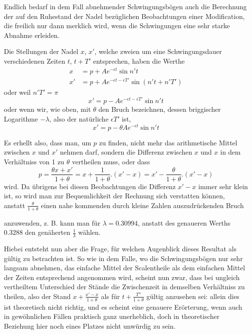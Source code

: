 Endlich bedarf in dem Fall abnehmender Schwingungsbögen auch die Berechnung der auf den Ruhestand der Nadel bezüglichen Beobachtungen einer Modification, die freilich nur dann merklich wird, wenn die Schwingungen eine sehr starke Abnahme erleiden.

Die Stellungen der Nadel $x$, $x'$, welche zweien um eine Schwingungsdauer verschiedenen Zeiten $t$, $t+T'$ entsprechen, haben die Werthe
\[
\begin{aligned}
x&=p+Ae^{-\epsilon t}\sin n't\\
x'&=p+Ae^{-\epsilon t-\epsilon T'}\sin(n't+n'T')
\end{aligned}
\]
oder weil $n'T'=\pi$
\[
x'=p-Ae^{-\epsilon t-\epsilon T'}\sin n't
\]
oder wenn wir, wie oben, mit $\theta$ den Bruch bezeichnen, dessen briggischer Logarithme $-\lambda$, also der natürliche $\epsilon T'$ ist,
\[
x'=p-\theta Ae^{-\epsilon t}\sin n't
\]

Es erhellt also, dass man, um $p$ zu finden, nicht mehr das arithmetische Mittel zwischen $x$ und $x'$ nehmen darf, sondern die Differenz zwischen $x$ und $x$ in dem Verhältniss von 1 zu $\theta$ vertheilen muss, oder dass
\[
p=\frac{\theta x+x'}{1+\theta}=x+\frac{1}{1+\theta}.(x'-x)=x'-\frac{\theta}{1+\theta}.(x'-x)
\]
wird. Da übrigens bei diesen Beobachtungen die Differenz $x'-x$ immer sehr klein ist, so wird man zur Bequemlichkeit der Rechnung sich verstatten können, anstatt $\frac{\theta}{1+\theta}$ einen nahe kommenden durch kleine Zahlen auszudrückenden Bruch
\par\clearpage
{}
\noindent anzuwenden, z. B. kann man für $\lambda=0.30994$, anstatt des genaueren Werths $0.3288$ den genäherten $\tfrac13$ wählen.

Hiebei entsteht nun aber die Frage, für welchen Augenblick dieses Resultat als gültig zu betrachten ist. So wie in dem Falle, wo die Schwingungsbögen nur sehr langsam abnehmen, das einfache Mittel der Scalentheile als dem einfachen Mittel der Zeiten entsprechend angenommen wird, scheint nun zwar, dass bei ungleich vertheiltem Unterschied der Stände die Zwischenzeit in demselben Verhältniss zu theilen, also der Stand $x+\frac{x'-x}{1+\theta}$ als für $t+\frac{T''}{1+\theta}$ gültig anzusehen sei: allein dies ist theoretisch nicht richtig, und es scheint eine genauere Erörterung, wenn auch in gewöhnlichen Fällen praktisch ganz unerheblich, doch in theoretischer Beziehung hier noch eines Platzes nicht unwürdig zu sein.

